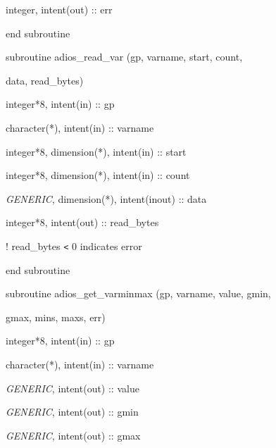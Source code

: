\vspace{10pt}
integer,        intent(out) :: err

\vspace{10pt}
\parindent=0pt
end subroutine

\vspace{22pt}
subroutine adios\_read\_var (gp, varname, start, count,

\vspace{10pt}
\parindent=97pt
data, read\_bytes)

\vspace{10pt}
\parindent=36pt
integer*8,      intent(in)  :: gp

\vspace{10pt}
character(*),   intent(in)  :: varname

\vspace{10pt}
integer*8, dimension(*), intent(in) :: start

\vspace{10pt}
integer*8, dimension(*), intent(in) :: count

\vspace{10pt}
\textit{GENERIC}, dimension(*), intent(inout) :: data

\vspace{10pt}
integer*8,      intent(out) :: read\_bytes

\vspace{10pt}
! read\_bytes \texttt{<} 0 indicates error

\vspace{10pt}
\parindent=0pt
end subroutine

\vspace{22pt}
subroutine adios\_get\_varminmax (gp, varname, value, gmin, 

\vspace{10pt}
\parindent=115pt
gmax, mins, maxs, err)

\vspace{10pt}
\parindent=36pt
integer*8,      intent(in)  :: gp

\vspace{10pt}
character(*),   intent(in)  :: varname

\vspace{10pt}
\textit{GENERIC},        intent(out) :: value

\vspace{10pt}
\textit{GENERIC},        intent(out) :: gmin

\vspace{10pt}
\textit{GENERIC},        intent(out) :: gmax

